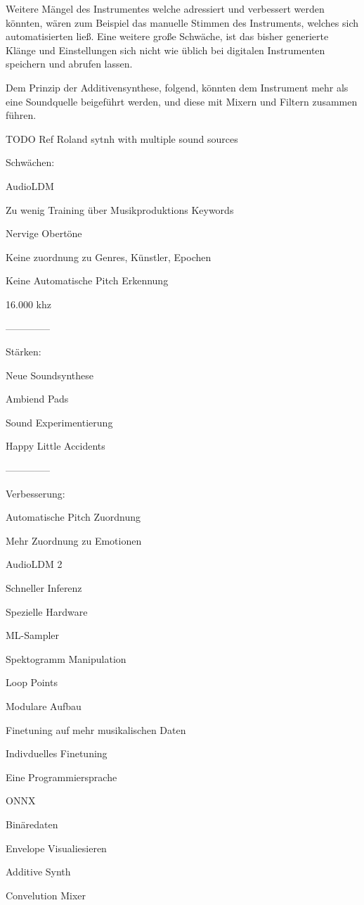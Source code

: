 \documentclass[
  a4paper,  %
  twoside,  %
  bibliography=totoc,
  headsepline,
  cleardoublepage=empty,
  parskip=half,
  draft=false
]{scrbook}
\begin{document}
Weitere Mängel des Instrumentes welche adressiert und verbessert werden könnten, wären zum Beispiel das manuelle Stimmen des Instruments, welches sich automatisierten ließ. Eine weitere große Schwäche, ist das bisher generierte Klänge und Einstellungen sich nicht wie üblich bei digitalen Instrumenten speichern und abrufen lassen. 

Dem Prinzip der Additivensynthese, folgend, könnten dem Instrument mehr als eine Soundquelle beigeführt werden, und diese mit Mixern und Filtern zusammen führen. 


TODO Ref Roland sytnh with multiple sound sources  

Schwächen:

AudioLDM

Zu wenig Training über Musikproduktions Keywords

Nervige Obertöne

Keine zuordnung zu Genres, Künstler, Epochen

Keine Automatische Pitch Erkennung

16.000 khz 

--------------

Stärken:

Neue Soundsynthese

Ambiend Pads

Sound Experimentierung

Happy Little Accidents


--------------

Verbesserung:

Automatische Pitch Zuordnung

Mehr Zuordnung zu Emotionen 

AudioLDM 2

Schneller Inferenz

Spezielle Hardware 

ML-Sampler

Spektogramm Manipulation 

Loop Points

Modulare Aufbau 

Finetuning auf mehr musikalischen Daten

Indivduelles Finetuning 

Eine Programmiersprache

ONNX

Binäredaten

Envelope Visualiesieren

Additive Synth

Convelution Mixer
\end{document}
